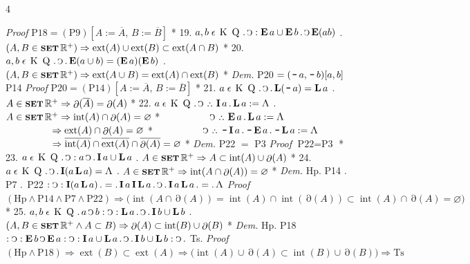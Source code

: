 \documentclass{book}
\newcommand{\s}{\switchcolumn} %
\newcommand{\C}{\mathop{\sbox0{$\displaystyle$$\reflectbox{C}$} %
\raisebox{-\height+\ht0-0.05cm}[\ht0][\dp0]{\scalebox{0.8}[0.8]{\copy0}}}\displaylimits} %
\newcommand{\p}{\mathop{\sbox0{$\displaystyle$$.$}
\raisebox{-\height+\ht0}[\ht0][\dp0]{\scalebox{1}[1]{\copy0}}}\displaylimits} %
\newcommand{\pppNoSpace}{\leavevmode\lower0ex\hbox{.}\kern-0.1em\raise0.7ex\hbox{.}\kern-0.1em\lower0ex\hbox{.}} %
\newcommand{\ppp}{\thinspace \pppNoSpace\thinspace} %
\newcommand{\no}{\mathop{\thinspace \scalebox{1.5}{-}}}
\newcommand{\abs}{\mathop{\rotatebox[origin=c]{180}{V}}}
\newcommand{\smallIn}{\ensuremath{\mathrel{\epsilon}}}
\newcommand{\I}{\mathop{\textbf{I}}}
\newcommand{\E}{\mathop{\textbf{E}}}
\newcommand{\Lfat}{\mathop{\textbf{L}}}
\newcommand{\K}{\mathop{\thinspace \text{K} \thinspace}}
\newcommand{\Q}{\mathop{\thinspace \text{Q} \thinspace}}
\newcommand{\setOfSets}{\mathop{\text{{\footnotesize \textbf{SET}}}}}
\renewcommand{\rightarrow}{\Rightarrow}
\DeclareMathOperator{\interior}{int}
\DeclareMathOperator{\exterior}{ext}
\DeclareMathOperator{\boundary}{\partial}
\newenvironment{translateFourCol}[4]
               { %
                 \setcolumnwidth{#1\fill/1em, #2\fill/\columnsep, #3\fill/1em, #4\fill}
                 \begin{paracol}{4}
                 \newcommand{\LAT}{\switchcolumn[0]*}
                 \newcommand{\ENG}{\switchcolumn[2]}
               }
               { %
                 \let\ENG\undefined
                 \let\LAT\undefined
                 \end{paracol}
               }
\begin{document}
\begin{translateFourCol}{0.08}{0.42}{0.08}{0.42}
\ENG
\emph{Proof} \s $\text{P18} = (\text{P9})[A:=\overline{A},\, B:=\overline{B}]$
\LAT
19. \s $a,b \smallIn \K \Q \p \C : \E a \cup \E b \p \C \E (ab)$
\ENG
19. \s $(A,B \in \setOfSets \mathbb{R}^+) \rightarrow \exterior(A) \cup \exterior(B) \subset \exterior(A \cap B)$
\LAT
20. \s $a,b \smallIn \K \Q \p \C \p \E (a \cup b) = (\E a) (\E b)$
\ENG
20. \s $(A,B \in \setOfSets \mathbb{R}^+) \rightarrow \exterior(A \cup B) = \exterior(A) \cap \exterior(B)$
\LAT
\emph{Dem.} \s P20 $= (\no a, \no b) [a,b]$ P14
\ENG
\emph{Proof} \s $\text{P20} = (\text{P14})[A:=\overline{A},\, B:=\overline{B}]$
\LAT
21. \s $a \smallIn \K \Q \p \C \p \Lfat (\no a) = \Lfat a$
\ENG
21. \s $A \in \setOfSets \mathbb{R}^+ \rightarrow \boundary(\overline{A}) = \boundary(A)$
\LAT
22. \s $a \smallIn \K \Q \p \C \ppp \I a \p \Lfat a : = \abs$
\ENG
22. \s $A \in \setOfSets \mathbb{R}^+ \rightarrow \interior(A) \cap \boundary(A) = \varnothing$
\LAT
\s $\hspace{1.68cm} \C \ppp \E a \p \Lfat a : = \abs$
\ENG
\s $\hspace{1.68cm} \rightarrow \exterior(A) \cap \boundary(A) = \varnothing$
\LAT
\s $\hspace{1.68cm} \C \ppp \no \I a \p \no \E a \p \no \Lfat a : = \abs$
\ENG
\s $\hspace{1.68cm} \rightarrow \overline{\interior(A)} \cap \overline{\exterior(A)} \cap \overline{\boundary(A)} = \varnothing$
\LAT
\emph{Dem.} \s P22 $=$ P3
\ENG
\emph{Proof} \s $\text{P22} = \text{P3}$
\LAT
23. \s $a \smallIn \K \Q \p \C : a \C \p \I a \cup \Lfat a$
\ENG
23. \s $A \in \setOfSets \mathbb{R}^+ \rightarrow A \subset \interior(A) \cup \boundary(A)$
\LAT
24. \s $a \smallIn \K \Q \p \C \p \I (a \Lfat a) = \abs$
\ENG
24. \s $A \in \setOfSets \mathbb{R}^+ \rightarrow \interior(A \cap \boundary(A)) = \varnothing$
\LAT
\emph{Dem.} \s Hp. P14 $\p$ P7 $\p$ P22 $: \C : \I (a \Lfat a) \p = \p \I a \I \Lfat a \p \C \p \I a \Lfat a \p = \p \abs$
\ENG
\emph{Proof} \s $(\text{Hp} \wedge \text{P14} \wedge \text{P7} \wedge \text{P22}) \rightarrow \Big( \interior(A \cap \boundary(A)) = \interior(A) \cap \interior(\boundary(A)) \subset \interior(A) \cap \boundary(A) = \varnothing \Big)$
\LAT
25. \s $a,b \smallIn \K \Q \p a \C b : \C : \Lfat a \p \C \p \I b \cup \Lfat b$
\ENG
25. \s $(A,B \in \setOfSets \mathbb{R}^+ \wedge A \subset B) \rightarrow \boundary(A) \subset \interior(B) \cup \boundary(B)$
\LAT
\emph{Dem.} \s Hp. P18 $: \C : \E b \C \E a : \C : \I a \cup \Lfat a \p \C \p \I b \cup \Lfat b : \C \p$ Ts.
\ENG
\emph{Proof} \s $(\text{Hp} \wedge \text{P18}) \rightarrow \exterior(B) \subset \exterior(A) \rightarrow \Big( \interior(A) \cup \boundary(A) \subset \interior(B) \cup \boundary(B) \Big) \rightarrow \text{Ts}$

\end{translateFourCol}
\end{document}
